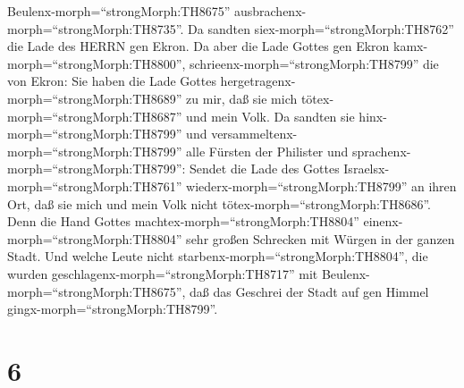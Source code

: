 Beulenx-morph=``strongMorph:TH8675''
ausbrachenx-morph=``strongMorph:TH8735''.  Da sandten
siex-morph=``strongMorph:TH8762'' die Lade des HERRN gen Ekron. Da aber
die Lade Gottes gen Ekron kamx-morph=``strongMorph:TH8800'',
schrieenx-morph=``strongMorph:TH8799'' die von Ekron: Sie haben die Lade
Gottes hergetragenx-morph=``strongMorph:TH8689'' zu mir, daß sie mich
tötex-morph=``strongMorph:TH8687'' und mein Volk.  Da
sandten sie hinx-morph=``strongMorph:TH8799'' und
versammeltenx-morph=``strongMorph:TH8799'' alle Fürsten der Philister
und sprachenx-morph=``strongMorph:TH8799'': Sendet die Lade des Gottes
Israelsx-morph=``strongMorph:TH8761''
wiederx-morph=``strongMorph:TH8799'' an ihren Ort, daß sie mich und mein
Volk nicht tötex-morph=``strongMorph:TH8686''. Denn die Hand Gottes
machtex-morph=``strongMorph:TH8804'' einenx-morph=``strongMorph:TH8804''
sehr großen Schrecken mit Würgen in der ganzen Stadt.  Und
welche Leute nicht starbenx-morph=``strongMorph:TH8804'', die wurden
geschlagenx-morph=``strongMorph:TH8717'' mit
Beulenx-morph=``strongMorph:TH8675'', daß das Geschrei der Stadt auf gen
Himmel gingx-morph=``strongMorph:TH8799''.

\hypertarget{section-5}{%
\section{6}\label{section-5}}

